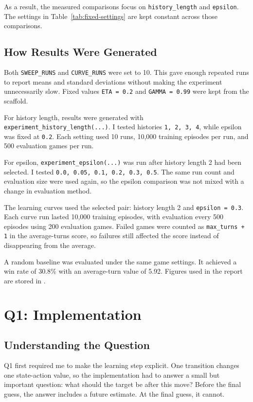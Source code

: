 \documentclass[11pt,a4paper]{article}
\begin{document}
As a result, the measured comparisons focus on \texttt{history\_length} and \texttt{epsilon}. The settings in Table~\ref{tab:fixed-settings} are kept constant across those comparisons.

\subsection{How Results Were Generated}

Both \texttt{SWEEP\_RUNS} and \texttt{CURVE\_RUNS} were set to 10. This gave enough repeated runs to report means and standard deviations without making the experiment unnecessarily slow. Fixed values \texttt{ETA = 0.2} and \texttt{GAMMA = 0.99} were kept from the scaffold.

For history length, results were generated with \texttt{experiment\_history\_length(...)}. I tested histories \texttt{1, 2, 3, 4}, while epsilon was fixed at \texttt{0.2}. Each setting used 10 runs, 10{,}000 training episodes per run, and 500 evaluation games per run.

For epsilon, \texttt{experiment\_epsilon(...)} was run after history length 2 had been selected. I tested \texttt{0.0, 0.05, 0.1, 0.2, 0.3, 0.5}. The same run count and evaluation size were used again, so the epsilon comparison was not mixed with a change in evaluation method.

The learning curves used the selected pair: history length 2 and \texttt{epsilon = 0.3}. Each curve run lasted 10{,}000 training episodes, with evaluation every 500 episodes using 200 evaluation games. Failed games were counted as \texttt{max\_turns + 1} in the average-turns score, so failures still affected the score instead of disappearing from the average.

A random baseline was evaluated under the same game settings. It achieved a win rate of 30.8\% with an average-turn value of 5.92. Figures used in the report are stored in .

\section{Q1: Implementation}

\subsection{Understanding the Question}

Q1 first required me to make the learning step explicit. One transition changes one state-action value, so the implementation had to answer a small but important question: what should the target be after this move? Before the final guess, the answer includes a future estimate. At the final guess, it cannot.
\end{document}

